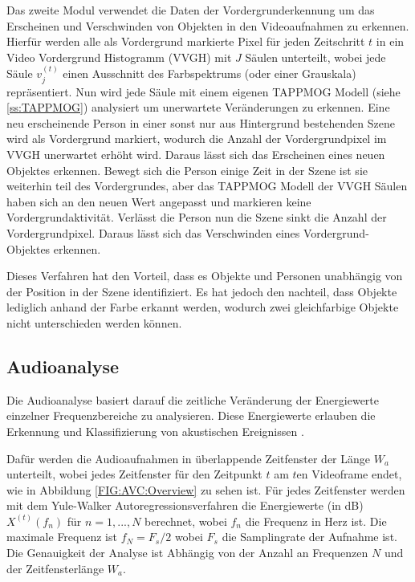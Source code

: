 Das zweite Modul verwendet die Daten der Vordergrunderkennung um das Erscheinen und Verschwinden von Objekten in den Videoaufnahmen zu erkennen. Hierfür werden alle als Vordergrund markierte Pixel für jeden Zeitschritt $t$ in ein Video Vordergrund Histogramm (VVGH) mit $J$ Säulen unterteilt, wobei jede Säule $v_j^{(t)}$ einen Ausschnitt des Farbspektrums (oder einer Grauskala) repräsentiert. Nun wird jede Säule mit einem eigenen TAPPMOG Modell (siehe \ref{ss:TAPPMOG}) analysiert um unerwartete Veränderungen zu erkennen. Eine neu erscheinende Person in einer sonst nur aus Hintergrund bestehenden Szene wird als Vordergrund markiert, wodurch die Anzahl der Vordergrundpixel im VVGH unerwartet erhöht wird. Daraus lässt sich das Erscheinen eines neuen Objektes erkennen. Bewegt sich die Person einige Zeit in der Szene ist sie weiterhin teil des Vordergrundes, aber das TAPPMOG Modell der VVGH Säulen haben sich an den neuen Wert angepasst und markieren keine Vordergrundaktivität. Verlässt die Person nun die Szene sinkt die Anzahl der Vordergrundpixel. Daraus lässt sich das Verschwinden eines Vordergrund-Objektes erkennen.    

Dieses Verfahren hat den Vorteil, dass es Objekte und Personen unabhängig von der Position in der Szene identifiziert. Es hat jedoch den nachteil, dass Objekte lediglich anhand der Farbe erkannt werden, wodurch zwei gleichfarbige Objekte nicht unterschieden werden können. 

\subsection{Audioanalyse}

Die Audioanalyse basiert darauf die zeitliche Veränderung der Energiewerte einzelner Frequenzbereiche zu analysieren. Diese Energiewerte erlauben die Erkennung und Klassifizierung von akustischen Ereignissen \cite{Pel:CASR}.

Dafür werden die Audioaufnahmen in überlappende Zeitfenster der Länge $W_a$ unterteilt, wobei jedes Zeitfenster für den Zeitpunkt $t$ am $t$en Videoframe endet, wie in Abbildung \ref{FIG:AVC:Overview} zu sehen ist. Für jedes Zeitfenster werden mit dem Yule-Walker Autoregressionsverfahren \cite{Mar:DSA} die Energiewerte (in dB) $X^{(t)}(f_n)$ für $n = 1, ..., N$ berechnet, wobei $f_n$ die Frequenz in Herz ist. Die maximale Frequenz ist $f_N = F_s / 2$ wobei $F_s$ die Samplingrate der Aufnahme ist. Die Genauigkeit der Analyse ist Abhängig von der Anzahl an Frequenzen $N$ und der Zeitfensterlänge $W_a$.

